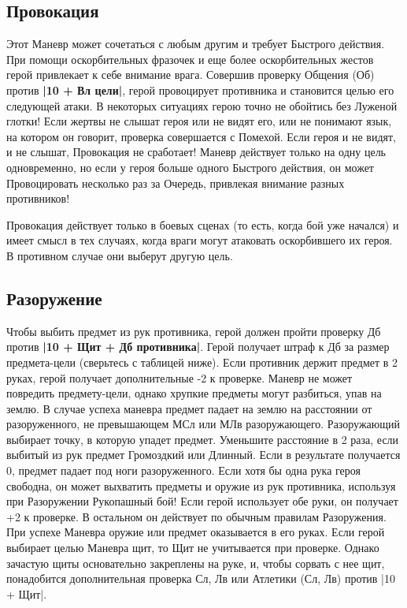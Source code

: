 \subsection{Провокация}
Этот Маневр может сочетаться с любым другим и требует Быстрого действия. При помощи оскорбительных фразочек и еще более оскорбительных жестов герой привлекает к себе внимание врага. Совершив проверку Общения (Об) против \textbf{|10 + Вл цели|}, герой провоцирует противника и становится целью его следующей атаки. В некоторых ситуациях герою точно не обойтись без Луженой глотки!
Если жертвы не слышат героя или не видят его, или не понимают язык, на котором он говорит, проверка совершается с Помехой. Если героя и не видят, и не слышат, Провокация не сработает! Маневр действует только на одну цель одновременно, но если у героя больше одного Быстрого действия, он может Провоцировать несколько раз за Очередь, привлекая внимание разных противников!
\begin{tcolorbox}
Провокация действует только в боевых сценах (то есть, когда бой уже начался) и имеет смысл в тех случаях, когда враги могут атаковать оскорбившего их героя. В противном случае они выберут другую цель. 
\end{tcolorbox}
\subsection{Разоружение}
Чтобы выбить предмет из рук противника, герой должен пройти проверку Дб против \textbf{|10 + Щит + Дб противника|}. Герой получает штраф к Дб за размер предмета-цели (сверьтесь с таблицей ниже). Если противник держит предмет в 2 руках, герой получает дополнительные -2 к проверке. Маневр не может повредить предмету-цели, однако хрупкие предметы могут разбиться, упав на землю. В случае успеха маневра предмет падает на землю на расстоянии от разоруженного, не превышающем МСл или МЛв разоружающего. Разоружающий выбирает точку, в которую упадет предмет. Уменьшите расстояние в 2 раза, если выбитый из рук предмет Громоздкий или Длинный. Если в результате получается 0, предмет падает под ноги разоруженного.
\newline
Если хотя бы одна рука героя свободна, он может выхватить предметы и оружие из рук противника, используя при Разоружении Рукопашный бой! Если герой использует обе руки, он получает +2 к проверке. В остальном он действует по обычным правилам Разоружения. При успехе Маневра оружие или предмет оказывается в его руках. Если герой выбирает целью Маневра щит, то Щит не учитывается при проверке. Однако зачастую щиты основательно закреплены на руке, и, чтобы сорвать с нее щит, понадобится дополнительная проверка Сл, Лв или Атлетики (Сл, Лв) против |10 + Щит|.
